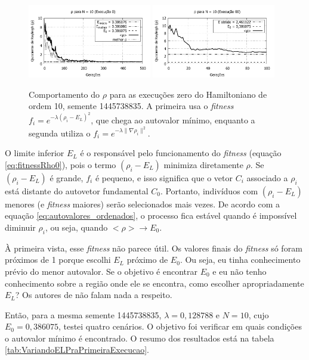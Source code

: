 	
	\begin{figure}[htbp]
		\centering
			\includegraphics[width=0.48\textwidth]{figs/resultados/fitnessEL/N-10_E-0_rho.pdf}
			\includegraphics[width=0.48\textwidth]{figs/resultados/fitnessGrad/N10_00_rho.pdf}
		\caption{Comportamento do $\rho$ para as execuções zero do Hamiltoniano de ordem 10, semente 1445738835. A primeira usa o \textit{fitness} $f_i = e^{-\lambda(\rho_i - E_L)^2}$, que chega ao autovalor mínimo, enquanto a segunda utiliza o $f_i = e^{-\lambda \| \nabla \rho_i \|^2}$.}
		\label{fig:N-10_E-0_rho_comparacao}
	\end{figure}	
	
	O limite inferior $E_L$ é o responsável pelo funcionamento do \emph{fitness} (equação \ref{eq:fitnessRho0}), pois o termo $(\rho_i - E_L)$ minimiza diretamente $\rho$. Se $(\rho_i - E_L)$ é grande, $f_i$ é pequeno, e isso significa que o vetor $C_i$ associado a $\rho_i$ está distante do autovetor fundamental $C_0$. Portanto, indivíduos com $(\rho_i - E_L)$ menores (e \emph{fitness} maiores) serão selecionados mais vezes. De acordo com a equação \ref{eq:autovalores_ordenados}, o processo fica estável quando é impossível diminuir $\rho_i$, ou seja, quando $<\rho> \rightarrow E_0$. 

	À primeira vista, esse \emph{fitness} não parece útil. Os valores finais do \emph{fitness} só foram próximos de 1 porque escolhi $E_L$ próximo de $E_0$. Ou seja, eu tinha conhecimento prévio do menor autovalor. Se o objetivo é encontrar $E_0$ e eu não tenho conhecimento sobre a região onde ele se encontra, como escolher apropriadamente $E_L$? Os autores de \cite{metodo2011} não falam nada a respeito.
	
	Então, para a mesma semente 1445738835, $\lambda = 0,128788$ e $N = 10$, cujo $E_0 = 0,386075$, testei quatro cenários. O objetivo foi verificar em quais condições o autovalor mínimo é encontrado. O resumo dos resultados está na tabela \ref{tab:VariandoELPraPrimeiraExecucao}.
	
